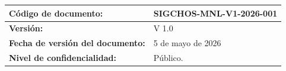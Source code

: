 \vspace*{3cm}

\begin{center}
\renewcommand{\arraystretch}{1.8}
\begin{tabular}{|p{7.5cm}|p{7.5cm}|}
    \hline
    \textbf{Código de documento:} & SIGCHOS-MNL-V1-2026-001 \\
    \hline
    \textbf{Versión:} & V 1.0 \\
    \hline
    \textbf{Fecha de versión del documento:} & 5 de mayo de 2026 \\
    \hline
    \textbf{Nivel de confidencialidad:} & Público. \\
    \hline
\end{tabular}
\end{center}

\vfill
\clearpage